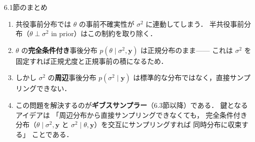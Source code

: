 \documentclass[lualatex,ja=standard,a4paper,12pt]{bxjsarticle}
\begin{document}
\begin{thmbox}{6.1節のまとめ}
\begin{enumerate}
  \item 共役事前分布では $\theta$ の事前不確実性が $\sigma^2$ に連動してしまう．
        半共役事前分布（$\theta \perp \sigma^2$ in prior）はこの制約を取り除く．

  \item $\theta$ の\textbf{完全条件付き}事後分布
        $p(\theta \mid \sigma^2, \boldsymbol{y})$ は正規分布のまま——
        これは $\sigma^2$ を固定すれば正規尤度と正規事前の積になるため．

  \item しかし $\sigma^2$ の\textbf{周辺}事後分布 $p(\sigma^2 \mid \boldsymbol{y})$
        は標準的な分布ではなく，直接サンプリングできない．

  \item この問題を解決するのが\textbf{ギブスサンプラー}（6.3節以降）である．
        鍵となるアイデアは
        「周辺分布から直接サンプリングできなくても，
        完全条件付き分布（$\theta \mid \sigma^2, \boldsymbol{y}$ と
        $\sigma^2 \mid \theta, \boldsymbol{y}$）を交互にサンプリングすれば
        同時分布に収束する」
        ことである．
\end{enumerate}
\end{thmbox}
\end{document}
